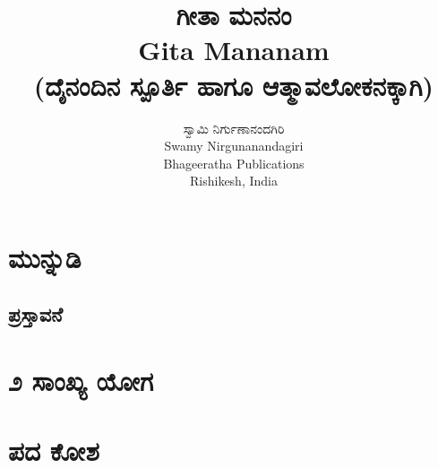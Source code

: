 \documentclass[12pt,twoside,openright,a5paper]{book}
\title{\Huge \kanfont \textbf{ಗೀತಾ ಮನನಂ}\\
{\normalsize Gita Mananam\\}
{\small(ದೈನಂದಿನ ಸ್ಪೂರ್ತಿ ಹಾಗೂ ಆತ್ಮಾವಲೋಕನಕ್ಕಾಗಿ)}}
\author{\large \kanfont ಸ್ವಾಮಿ ನಿರ್ಗುಣಾನಂದಗಿರಿ\\
{\normalsize Swamy Nirgunanandagiri}\\
\vspace{15mm}
{\normalsize Bhageeratha Publications}\\
{Rishikesh, India}
}
\date{} %
\begin{document}




\thispagestyle{empty}
\frontmatter

\doublespacing
\tableofcontents
\singlespacing

\thispagestyle{empty}
\thispagestyle{empty}
\pagestyle{fancy}


\chapter{\kanfont ಮುನ್ನುಡಿ}

\begin{onehalfspace}
\chapter{\kanfont ಪ್ರಸ್ತಾವನೆ}

\end{onehalfspace}
\mainmatter

%
\makeatletter\@openrightfalse
\chapter{\kanfont ೨ ಸಾಂಖ್ಯ ಯೋಗ}


\chapter{\kanfont ಪದ ಕೋಶ}

\printindex

\end{document}
